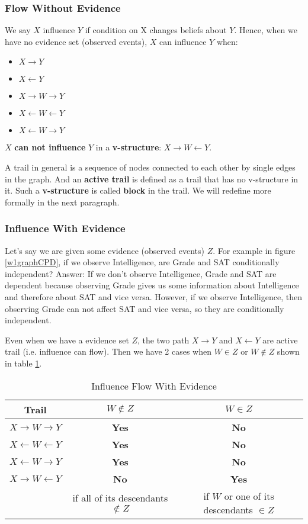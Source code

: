 \subsubsection{Flow Without Evidence}
We say $X$ influence $Y$ if condition on X changes beliefs about $Y$. Hence, when we have no evidence set (observed events), $X$ can influence $Y$ when:
\begin{itemize}
	\item $X \rightarrow Y$
	\item $X \leftarrow Y$
	\item $X \rightarrow W \rightarrow Y$ 
	\item $X \leftarrow W \leftarrow Y$ 
	\item $X \leftarrow W \rightarrow Y$ 
\end{itemize}
$X$ \textbf{can not influence} $Y$ in a \textbf{v-structure}: $X \rightarrow W \leftarrow Y$. 

A trail in general is a sequence of nodes connected to each other by single edges in the graph. And an \textbf{active trail} is defined as a trail that has no v-structure in it. Such a \textbf{v-structure} is called \textbf{block} in the trail. We will redefine more formally in the next paragraph.

\subsubsection{Influence With Evidence}
Let's say we are given some evidence (observed events) $Z$. For example in figure \ref{w1graphCPD}, if we observe Intelligence, are Grade and SAT conditionally independent? 
Answer: If we don't observe Intelligence, Grade and SAT are dependent because observing Grade gives us some information about Intelligence and therefore about SAT and vice versa. However, if we observe Intelligence, then observing Grade can not affect SAT and vice versa, so they are conditionally independent.

Even when we have a evidence set $Z$, the two path $X \rightarrow Y$ and $X \leftarrow Y$ are active trail (i.e. influence can flow). Then we have 2 cases when $W \in Z$ or $W \notin Z$ shown in table \ref{w1TabFlowEvid}.

\begin{table}
\begin{tabular}{c | c | c}
Trail & $W \notin Z$ & $W \in Z$\\
\hline \hline
$X \rightarrow W \rightarrow Y$ & \textbf{Yes} & \textbf{No}  \\
\hline
$X \leftarrow W \leftarrow Y$   & \textbf{Yes} & \textbf{No}  \\
\hline
$X \leftarrow W \rightarrow Y$  & \textbf{Yes} & \textbf{No}  \\
\hline
$X \rightarrow W \leftarrow Y$  & \textbf{No}  & \textbf{Yes}  \\
								& if all of its descendants $\notin Z$ & if $W$ or one of its descendants $\in Z$ 
\end{tabular}
\caption{Influence Flow With Evidence}
\label{w1TabFlowEvid}
\end{table}

